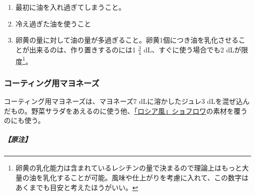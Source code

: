 \begin{recette}
\begin{enumerate}
  \begin{enumerate}
  \def\labelenumii{\arabic{enumii}.}
  \tightlist
  \item
    最初に油を入れ過ぎてしまうこと。
  \item
    冷え過ぎた油を使うこと
  \item
    卵黄の量に対して油の量が多過ぎること。卵黄1個につき油を乳化させることが出来るのは、作り置きするのには1
    \(\frac{3}{4}\) dL、すぐに使う場合でも2 dLが限度\footnote{卵黄の乳化能力は含まれているレシチンの量で決まるので理論上はもっと大量の油を乳化することが可能。風味や仕上がりを考慮に入れて、この数字はあくまでも目安と考えたほうがいい。}。
  \end{enumerate}
\end{enumerate}

\atoaki{}

\hypertarget{mayonnaise-collee}{%
\subsubsection{コーティング用マヨネーズ}\label{mayonnaise-collee}}



コーティング用マヨネーズは、マヨネーズ7 dLに溶かしたジュレ3
dLを混ぜ込んだもの。野菜サラダをあえるのに使う他、\protect\hyperlink{}{「ロシア風」ショフロワ}の素材を覆うのにも使う。

\hypertarget{nota-mayonnaise-collee}{%
\subparagraph{【原注】}\label{nota-mayonnaise-collee}}


\end{recette}
